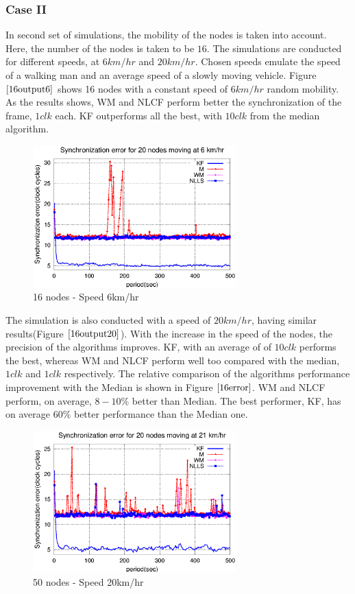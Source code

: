 \documentclass[a4paper,10pt]{report}
\begin{document}
\subsubsection{\textbf{Case II}}In second set of simulations,
the mobility of the nodes is taken into account. Here, the number of
the nodes is taken to be $16$. The simulations are conducted for
different speeds, at $6km/hr$ and $20km/hr$. Chosen speeds emulate
the speed of a walking man and an average speed of a slowly moving
vehicle. \newline Figure $\ref{16output6}$ shows 16 nodes with a
constant speed of $6km/hr$ random mobility. As the results shows, WM
and NLCF perform better the synchronization of the frame, $1 clk$
each. KF outperforms all the best, with $10 clk$ from the median
algorithm. \newline
\begin{figure}
\centering
\includegraphics[width=0.7\textwidth]{16output-s6}
\caption{16 nodes - Speed 6km/hr} \label{16output6}
\end{figure}
The simulation is also conducted with a speed of
$20km/hr$, having similar results(Figure $\ref{16output20}$). With
the increase in the speed of the nodes, the precision of the
algorithms improves. KF, with an average of of $10 clk$ performs the
best, whereas WM and NLCF perform well too compared with the median,
$1 clk$ and $1 clk$ respectively. The relative comparison of the
algorithms performance improvement with the Median is shown in
Figure $\ref{16error}$. WM and NLCF perform, on average, $8-10\%$
better than Median. The best performer, KF, has on average $60\%$
better performance than the Median one.
\begin{figure}
\centering
\includegraphics[width=0.7\textwidth]{16output-s20}
\caption{50 nodes - Speed 20km/hr} \label{16output20}
\end{figure}
\end{document}

